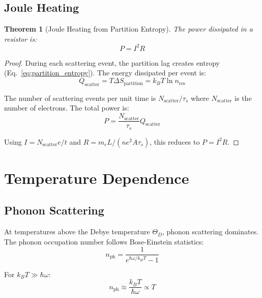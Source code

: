 \documentclass[twocolumn,showpacs,preprintnumbers,amsmath,amssymb,prd]{revtex4-2}
\newtheorem{theorem}{Theorem}[section]
\newcommand{\taus}{\tau_s}
\begin{document}
\subsection{Joule Heating}

\begin{theorem}[Joule Heating from Partition Entropy]
\label{thm:joule}
The power dissipated in a resistor is:
\begin{equation}
P = I^2 R
\label{eq:joule}
\end{equation}
\end{theorem}

\begin{proof}
During each scattering event, the partition lag creates entropy (Eq.~\ref{eq:partition_entropy}). The energy dissipated per event is:
\begin{equation}
Q_{\text{scatter}} = T\Delta S_{\text{partition}} = k_B T \ln n_{\text{res}}
\label{eq:heat_per_scatter}
\end{equation}

The number of scattering events per unit time is $N_{\text{scatter}}/\taus$ where $N_{\text{scatter}}$ is the number of electrons. The total power is:
\begin{equation}
P = \frac{N_{\text{scatter}}}{\taus} Q_{\text{scatter}}
\label{eq:total_power}
\end{equation}

Using $I = N_{\text{scatter}}e/t$ and $R = m_e L/(ne^2 A\taus)$, this reduces to $P = I^2R$.
\end{proof}


\section{Temperature Dependence}
\label{sec:temperature}

\subsection{Phonon Scattering}

At temperatures above the Debye temperature $\Theta_D$, phonon scattering dominates. The phonon occupation number follows Bose-Einstein statistics:
\begin{equation}
n_{\text{ph}} = \frac{1}{e^{\hbar\omega/k_BT} - 1}
\label{eq:bose_einstein}
\end{equation}

For $k_BT \gg \hbar\omega$:
\begin{equation}
n_{\text{ph}} \approx \frac{k_BT}{\hbar\omega} \propto T
\label{eq:phonon_high_t}
\end{equation}
\end{document}
